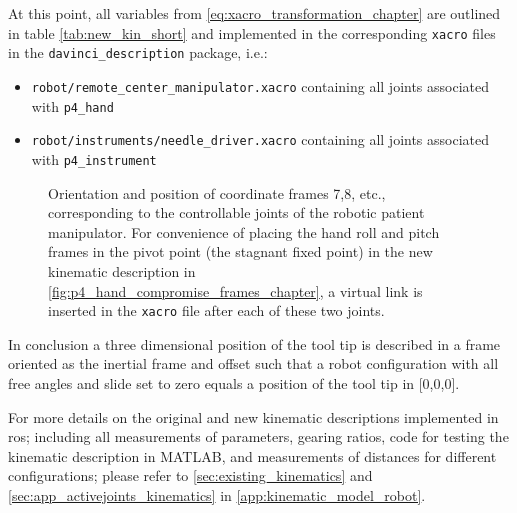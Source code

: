 At this point, all variables from \autoref{eq:xacro_transformation_chapter} are outlined in table \ref{tab:new_kin_short} and implemented in the corresponding \texttt{xacro} files in the \texttt{davinci\_description} package, i.e.:
\begin{itemize}
\item \texttt{robot/remote\_center\_manipulator.xacro} containing all joints associated with \texttt{p4\_hand}
\item \texttt{robot/instruments/needle\_driver.xacro} containing all joints associated with \texttt{p4\_instrument}
\end{itemize}
%
\begin{figure}[H]
\hspace*{-8mm}
\begin{minipage}{1.15\textwidth}
	\vspace*{5mm}
	\caption{Orientation and position of coordinate frames 7,8, etc., corresponding to the controllable joints of the robotic patient manipulator.  For convenience of placing the hand roll and pitch frames in the pivot point (the stagnant fixed point) in the new kinematic description in \autoref{fig:p4_hand_compromise_frames_chapter}, a virtual link is inserted in the \texttt{xacro} file after each of these two joints.}
	\label{fig:robot_hand_kinematics}
\end{minipage}
\end{figure}
In conclusion a three dimensional position of the tool tip is described in a frame oriented as the inertial frame and offset such that a robot configuration with all free angles and slide set to zero equals a position of the tool tip in [0,0,0].

For more details on the original and new kinematic descriptions implemented in \gls{ros}; including all measurements of parameters, gearing ratios, code for testing the kinematic description in MATLAB, and measurements of distances for different configurations; please refer to \autoref{sec:existing_kinematics} and \ref{sec:app_activejoints_kinematics} in \autoref{app:kinematic_model_robot}.










